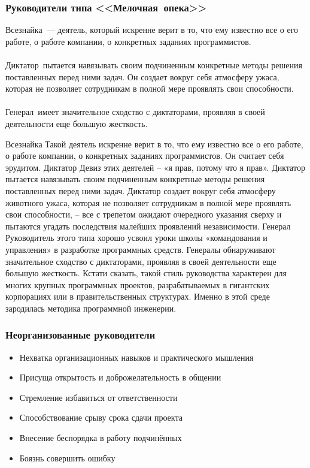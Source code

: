 \documentclass{../industrial-development}
\begin{document}
{\begin{frame} \frametitle{Руководители типа <<Мелочная~опека>>}
	\alert{Всезнайка}~— деятель, который искренне верит в то, что ему известно все о его работе, о работе компании, о конкретных заданиях программистов.\\~\\
\alert{Диктатор}~пытается навязывать своим подчиненным конкретные методы решения поставленных перед ними задач. Он создает вокруг себя атмосферу ужаса, которая не позволяет сотрудникам в полной мере проявлять свои способности.\\~\\
\alert{Генерал}~имеет значительное сходство с диктаторами, проявляя в своей деятельности еще большую жесткость.
\\
\end{frame}
\lecturenotes
Всезнайка 
Такой деятель искренне верит в то, что ему известно все о его работе, о работе компании, о конкретных заданиях программистов. Он считает себя эрудитом. 
Диктатор 
Девиз этих деятелей – «я прав, потому что я прав». Диктатор пытается навязывать своим подчиненным конкретные методы решения поставленных перед ними задач. Диктатор создает вокруг себя атмосферу животного ужаса, которая не позволяет сотрудникам в полной мере проявлять свои способности, – все с трепетом ожидают очередного указания сверху и пытаются угадать последствия малейших проявлений независимости. 
Генерал
Руководитель этого типа хорошо усвоил уроки школы «командования и управления» в разработке программных средств. Генералы обнаруживают значительное сходство с диктаторами, проявляя в своей деятельности еще большую жесткость.
Кстати сказать, такой стиль руководства характерен для многих крупных программных проектов, разрабатываемых в гигантских корпорациях или в правительственных структурах. Именно в этой среде зародилась методика программной инженерии. 



\begin{frame} \frametitle{Неорганизованные руководители}
	\begin{itemize}
		\item Нехватка организационных навыков и практического мышления
		\item Присуща открытость и доброжелательность в общении
		\item Стремление избавиться от ответственности
		\item Способствование срыву срока сдачи проекта
		\item Внесение беспорядка в работу подчинённых
		\item Боязнь совершить ошибку
		

\end{itemize}
\end{frame}}
\end{document}
